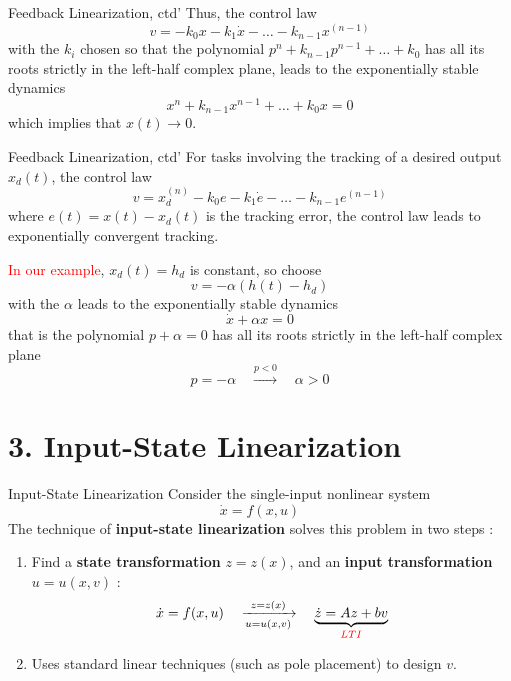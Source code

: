 \documentclass{beamer}
\begin{document}
  \begin{frame}{Feedback Linearization, ctd'}
    Thus, the control law
    $$ v = -k_{0}x-k_{1}\dot{x}- \dots - k_{n-1}x^{(n-1)} $$
    with the $k_{i}$ chosen so that the polynomial $p^{n}+k_{n-1}p^{n-1} + \dots + k_{0}$ has all its roots strictly in the left-half complex plane, leads to the exponentially stable dynamics
    $$
    x^{n}+k_{n-1}x^{n-1}+\dots+k_{0}x = 0
    $$
    which implies that $x(t) \rightarrow 0$.
  \end{frame}

  \begin{frame}{Feedback Linearization, ctd'}
    For tasks involving the tracking of a desired output $x_{d}(t)$, the control law
    \begin{equation}\label{tracking}
      v = x_{d}^{(n)} - k_{0}e - k_{1}\dot{e}-\dots-k_{n-1}e^{(n-1)}
    \end{equation}
    where $e(t) = x(t)-x_{d}(t)$ is the tracking error, the control law leads to exponentially convergent tracking.
    \par \vspace{-5pt}
    \textcolor{red}{In our example}, $x_{d}(t)=h_{d}$ is constant, so choose
    $$v=-\alpha(h(t) - h_{d})$$
    with the $\alpha$ leads to the exponentially stable dynamics
    $$
    \dot{x} + \alpha x=0
    $$
    that is the polynomial $p+\alpha=0$ has all its roots strictly in the left-half complex plane
    $$
    p = -\alpha \quad \xrightarrow{p < 0} \quad \alpha > 0
    $$

  \end{frame}


  \section{3. Input-State Linearization}

  \begin{frame}{Input-State Linearization}
    Consider the single-input nonlinear system
    $$ \dot{x} = f(x,u) $$
    The technique of \textbf{input-state linearization} solves this problem in two steps :
    \begin{enumerate}
      \item Find a \textbf{state transformation} $z=z(x)$, and an \textbf{input transformation} $u=u(x,v)$ :
          $$ \dot{x} = f(x,u) \quad \xrightarrow[u=u(x,v)]{z=z(x)} \quad \underbrace{\dot{z}=Az+bv}_{{\color{red}LTI}} $$
      \item Uses standard linear techniques (such as pole placement) to design $v$.
    \end{enumerate}
  \end{frame}
\end{document}
